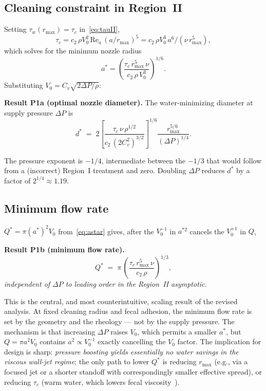 \documentclass[aps,prfluids,reprint,amsmath,amssymb,floatfix]{revtex4-2}
\newcommand{\Rey}{\mathrm{Re}}
\begin{document}
\subsection{Cleaning constraint in Region~II}

Setting $\tau_w(r_\mathrm{max}) = \tau_c$ in~\eqref{eq:tauII},
\begin{equation}
  \tau_c = c_2\,\rho V_0^2\,\Rey_a\,(a/r_\mathrm{max})^5
  = c_2\,\rho V_0^3\,a^6 / (\nu\,r_\mathrm{max}^5),
  \label{eq:cleanII}
\end{equation}
which solves for the minimum nozzle radius
\begin{equation}
  a^* = \left(\frac{\tau_c\,r_\mathrm{max}^5\,\nu}{c_2\,\rho\,V_0^3}\right)^{1/6}.
  \label{eq:astar}
\end{equation}
Substituting $V_0 = C_v\sqrt{2\Delta P/\rho}$:
\begin{mdframed}[style=resultbox]
\textbf{Result P1a (optimal nozzle diameter).}
The water-minimizing diameter at supply pressure $\Delta P$ is
\begin{equation}
  d^* \;=\; 2\left[\frac{\tau_c\,\nu\,\rho^{1/2}}{c_2\,(2 C_v^2)^{3/2}}\right]^{1/6}
  \frac{r_\mathrm{max}^{5/6}}{(\Delta P)^{1/4}}.
  \label{eq:dstar}
\end{equation}
\end{mdframed}
The pressure exponent is $-1/4$, intermediate between the $-1/3$ that
would follow from a (incorrect) Region~I treatment and zero. Doubling
$\Delta P$ reduces $d^*$ by a factor of $2^{1/4} \approx 1.19$.

\subsection{Minimum flow rate}

$Q^* = \pi (a^*)^2 V_0$ from~\eqref{eq:astar} gives, after the $V_0^{-1}$
in $a^{*2}$ cancels the $V_0^{+1}$ in $Q$,
\begin{mdframed}[style=resultbox]
\textbf{Result P1b (minimum flow rate).}
\begin{equation}
  Q^* \;=\; \pi\,\left(\frac{\tau_c\,r_\mathrm{max}^5\,\nu}{c_2\,\rho}\right)^{1/3},
  \label{eq:Qstar}
\end{equation}
\emph{independent of $\Delta P$ to leading order in the Region~II asymptotic}.
\end{mdframed}

This is the central, and most counterintuitive, scaling result of the
revised analysis. At fixed cleaning radius and fecal adhesion, the minimum
flow rate is set by the geometry and the rheology --- not by the supply
pressure. The mechanism is that increasing $\Delta P$ raises $V_0$, which
permits a smaller $a^*$, but $Q = \pi a^2 V_0$ contains $a^2 \propto V_0^{-1}$
exactly cancelling the $V_0$ factor. The implication for design is sharp:
\emph{pressure boosting yields essentially no water savings in the
viscous wall-jet regime}; the only path to lower $Q^*$ is reducing
$r_\mathrm{max}$ (e.g., via a focused jet or a shorter standoff with
correspondingly smaller effective spread), or reducing $\tau_c$ (warm
water, which lowers fecal viscosity~\citep{Woolley2014}).
\end{document}

